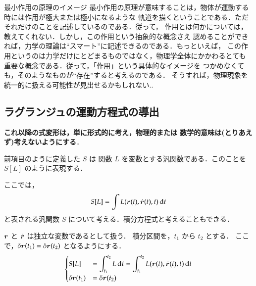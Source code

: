             \begin{memo}{最小作用の原理のイメージ}
                最小作用の原理が意味することは，物体が運動する時には作用が極大または極小になるような
                軌道を描くということである．ただそれだけのことを記述しているのである．従って，
                作用とは何かについては，教えてくれない．しかし，この作用という抽象的な概念さえ
                認めることができれば，力学の理論は“スマート”に記述できるのである．もっといえば，
                この作用というのは力学だけにとどまるものではなく，物理学全体にかかわるとても
                重要な概念である．従って，「作用」という具体的なイメージを
                つかめなくても，そのようなものが“存在”すると考えるのである．
                そうすれば，物理現象を統一的に扱える可能性が見出せるかもしれない..
            \end{memo}

        \subsection{ラグランジュの運動方程式の導出}
            \textbf{これ以降の式変形は，単に形式的に考え，物理的または
            数学的意味は(とりあえず)考えないようにする}．

            前項目のように定義した $S$ は
            関数 $L$ を変数とする汎関数である．このことを $S[L]$ のように表現する．

            ここでは，
                \begin{align}
                    S[L]=\int L(\boldsymbol{r}(t),\dot{\boldsymbol{r}}(t),t) \,\mathrm{d} t
                \end{align}
            と表される汎関数 $S$ について考える．積分方程式と考えることもできる．

            $\boldsymbol{r}$ と $\dot{\boldsymbol{r}}$ は独立な変数であるとして扱う．
            積分区間を，$t_{1}$ から $t_{2}$ とする．
            ここで，$\delta\boldsymbol{r}(t_{1})=\delta\boldsymbol{r}(t_{2})$ となるようにする．
                \begin{align}
                    \begin{cases}
                        \displaystyle S[L]  &= \displaystyle\int_{t_{1}}^{t_{2}} L \,\mathrm{d} t = \displaystyle\int_{t_{1}}^{t_{2}}
                        L(\boldsymbol{r}(t),\dot{\boldsymbol{r}}(t),t) \,\mathrm{d} t \\
                        \displaystyle \delta\boldsymbol{r}(t_{1}) &= \delta\displaystyle \boldsymbol{r}(t_{2})
                    \end{cases}
                \end{align}

